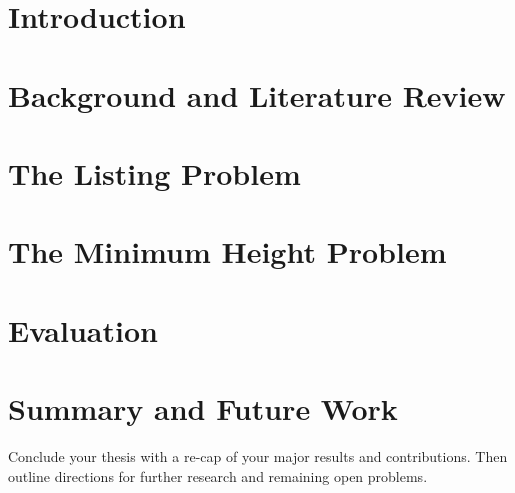 



\chapter{Introduction}
\label{chapter:intro}









\chapter{Background and Literature Review}
\label{chapter:Background}



\chapter{The Listing Problem}  
\label{chapter:listingproblem}





\chapter{The Minimum Height Problem}
\label{chapter:minheightproblem}







\chapter{Evaluation}  
\label{chapter:evaluation}



\chapter{Summary and Future Work}
\label{chapter:summary}

Conclude your thesis with a re-cap of your major results and contributions.  Then outline directions for further research and remaining open problems.

